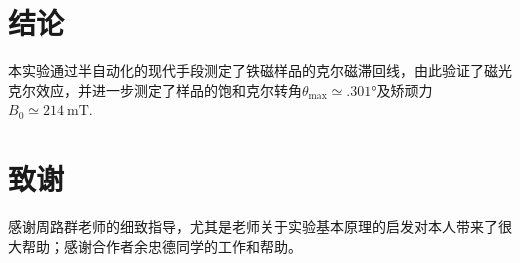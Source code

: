 \documentclass[aps,pre,12pt,preprint,%
	onecolumn,showpacs,showkeys,nofootinbib]{revtex4-1}
\begin{document}
\section{结论}
\vspace{-.5\baselineskip}
	本实验通过半自动化的现代手段测定了铁磁样品的克尔磁滞回线，由此验证了磁光克尔效应，并进一步测定了样品的饱和克尔转角$\theta_{\max} \simeq \ang{.301}$及矫顽力$B_0\simeq \SI{214}{\milli\tesla}$. 
\raggedbottom
\section{致谢}
\vspace{-.3\baselineskip}
	感谢周路群老师的细致指导，尤其是老师关于实验基本原理的启发对本人带来了很大帮助；感谢合作者余忠德同学的工作和帮助。
\vspace{.3\baselineskip}

\setlength{\bibsep}{1ex}
\linespread{1.}\selectfont

%

\clearpage
\linespread{1.5}\selectfont
\end{document}
